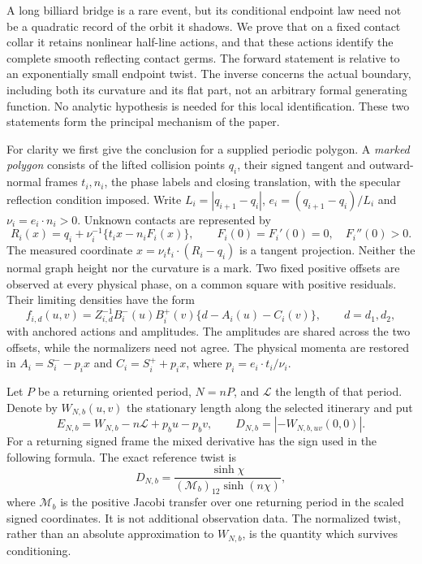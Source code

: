 A long billiard bridge is a rare event, but its conditional endpoint law
need not be a quadratic record of the orbit it shadows.  We prove that
on a fixed contact collar it retains nonlinear half-line actions, and
that these actions identify the complete smooth reflecting contact germs.
The forward statement is relative to an exponentially small endpoint
twist.  The inverse concerns the actual boundary, including both its
curvature and its flat part, not an arbitrary formal generating function.
No analytic hypothesis is needed for this local identification.  These
two statements form the principal mechanism of the paper.

For clarity we first give the conclusion for a supplied periodic polygon.
A \emph{marked polygon} consists of the lifted collision points $q_i$,
their signed tangent and outward-normal frames $t_i,n_i$, the phase labels
and closing translation, with the specular reflection condition imposed.
Write $L_i=|q_{i+1}-q_i|$, $e_i=(q_{i+1}-q_i)/L_i$ and
$\nu_i=e_i\cdot n_i>0$.  Unknown contacts are represented by
\[
 R_i(x)=q_i+\nu_i^{-1}\{t_i x-n_iF_i(x)\},\qquad
 F_i(0)=F_i'(0)=0,\quad F_i''(0)>0.
\]
The measured coordinate $x=\nu_i t_i\cdot(R_i-q_i)$ is a tangent
projection.  Neither the normal graph height nor the curvature is a mark.
Two fixed positive offsets are observed at every physical phase, on a
common square with positive residuals.  Their limiting densities have
the form
\[
 f_{i,d}(u,v)=Z_{i,d}^{-1}B_i^-(u)B_i^+(v)
              \{d-A_i(u)-C_i(v)\},\qquad d=d_1,d_2,
\]
with anchored actions and amplitudes.  The amplitudes are shared across
the two offsets, while the normalizers need not agree.  The physical
momenta are restored in $A_i=S_i^- -p_i x$ and
$C_i=S_i^+ +p_i x$, where $p_i=e_i\cdot t_i/\nu_i$.

Let $P$ be a returning oriented period, $N=nP$, and $\mathcal L$
the length of that period.  Denote by $W_{N,b}(u,v)$ the stationary
length along the selected itinerary and put
\[
 E_{N,b}=W_{N,b}-n\mathcal L+p_bu-p_bv,\qquad
 D_{N,b}=|-W_{N,b,uv}(0,0)|.
\]
For a returning signed frame the mixed derivative has the sign used in
the following formula.  The exact reference twist is
\[
 D_{N,b}=\frac{\sinh\chi}
 { (\mathcal M_b)_{12}\sinh(n\chi)},
\]
where $\mathcal M_b$ is the positive Jacobi transfer over one returning
period in the scaled signed coordinates.  It is not additional
observation data.  The normalized twist, rather than an absolute
approximation to $W_{N,b}$, is the quantity which survives conditioning.

